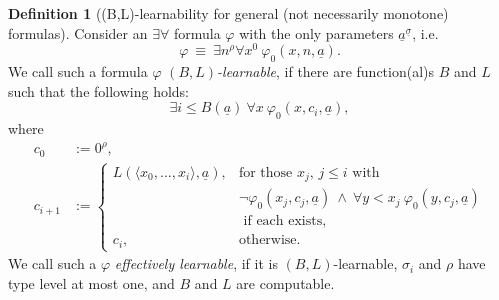 \documentclass[1p]{elsarticle}
\newcommand{\tup}{\underline} %
\newcommand{\Telse}{\text{otherwise}}
\theoremstyle{plain}
\theoremstyle{definition}
\newtheorem{dfn}[thm]{Definition}
\theoremstyle{remark}
\renewcommand{\phi}{\varphi}
\theoremstyle{definition}
\begin{document}
\begin{dfn}[(B,L)-learnability for general (not necessarily monotone) 
formulas]\label{d:fmcNum}
Consider an $\exists\forall$ formula $\phi$ with the only parameters $\tup a^{\tup \sigma}$, i.e.
\[\phi\ \equiv\ \exists n^\rho \forall x^0\ \phi_0(x,n,\tup a).\]
We call such a formula $\phi$ 
{\em $(B,L)$-learnable},
if there are function(al)s $B$ and $L$ such that the following holds:
\[ \exists i\leq B(\tup a)\ \forall x\ \phi_0(x,c_i,\tup a),\] where
\begin{align*}
c_0&:=0^{\rho},\\
c_{i+1}&:=
\begin{cases}
L(\langle x_0,\ldots,x_i\rangle, \tup a), &\text{for those $x_j$, $j\leq i$ with }\\
 &\neg\phi_0(x_j,c_j,\tup a)\ \wedge\ \forall y<x_j\ \phi_0(y,c_j,\tup a)\\
  &\text{ if each exists},\\
c_i, &\Telse.
\end{cases}
\end{align*}
We call such a $\phi$ {\em effectively learnable}, if it is $(B,L)$-learnable,
$\sigma_i$ and $\rho$ have type level at most one, and $B$ and $L$ are computable.
\end{dfn}
\newcommand{\seq}{_{(\cdot)}}
\end{document}
